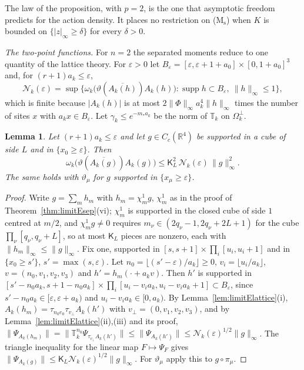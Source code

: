 \documentclass[aps,prd,twocolumn,superscriptaddress,nofootinbib,longbibliography,floatfix,amsmath,amssymb,10pt]{revtex4-2}
\newtheorem{lemma}[theorem]{Lemma}
\theoremstyle{definition}
\theoremstyle{remark}
\newcommand{\R}{\mathbb{R}}
\begin{document}
The law of the proposition, with $p=2$, is the one that asymptotic freedom
predicts for the action density. It places no restriction on
(M$_{\mathrm s}$) when $K$ is bounded on $\{|z|_\infty\ge\delta\}$ for every
$\delta>0$.

\emph{The two-point functions.} For $n=2$ the separated moments reduce to
one quantity of the lattice theory. For $\varepsilon>0$ let $B_\varepsilon=
[\varepsilon,\varepsilon+1+a_0]\times[0,1+a_0]^3$ and, for $(r+1)a_k\le
\varepsilon$,
\[
\mathcal N_k(\varepsilon)=\sup\bigl\{\omega_k\bigl(\vartheta(\overline{
A_k(h)})A_k(h)\bigr):\operatorname{supp}h\subset B_\varepsilon,\ \|h\|_\infty
\le1\bigr\},
\]
which is finite because $|A_k(h)|$ is at most $2\|\Phi\|_\infty
a_k^4\|h\|_\infty$ times the number of sites $x$ with $a_kx\in
B_\varepsilon$. Let $\gamma_k\le e^{-m_*a_k}$ be the norm of
$\mathbb T_k$ on $\Omega_k^\perp$.

\begin{lemma}\label{lem:limitEbox}
Let $(r+1)a_k\le\varepsilon$ and let $g\in C_c(\R^4)$ be supported in a cube
of side $L$ and in $\{x_0\ge\varepsilon\}$. Then
\[
\omega_k\bigl(\vartheta(\overline{A_k(g)})A_k(g)\bigr)\le\mathsf K_L^2\,
\mathcal N_k(\varepsilon)\,\|g\|_\infty^2 .
\]
The same holds with $\vartheta_\mu$ for $g$ supported in
$\{x_\mu\ge\varepsilon\}$.
\end{lemma}

\begin{proof}
Write $g=\sum_mh_m$ with $h_m=\chi^1_mg$, $\chi^1_m$ as in the proof of
Theorem~\ref{thm:limitEsep}(vi); $\chi^1_m$ is supported in the closed cube
of side $1$ centred at $m/2$, and $\chi^1_mg\ne0$ requires
$m_\nu\in(2q_\nu-1,2q_\nu+2L+1)$ for the cube $\prod_\nu[q_\nu,q_\nu+L]$,
so at most $\mathsf K_L$ pieces are nonzero, each with $\|h_m\|_\infty\le\|g
\|_\infty$. Fix one, supported in $[s,s+1]\times\prod_i[u_i,u_i+1]$ and in
$\{x_0\ge s'\}$, $s'=\max(s,\varepsilon)$. Let $n_0=\lfloor(s'-\varepsilon)
/a_k\rfloor\ge0$, $v_i=\lfloor u_i/a_k\rfloor$, $v=(n_0,v_1,v_2,v_3)$ and
$h'=h_m(\cdot+a_kv)$. Then $h'$ is supported in $[s'-n_0a_k,s+1-n_0a_k]\times
\prod_i[u_i-v_ia_k,u_i-v_ia_k+1]\subset B_\varepsilon$, since $s'-n_0a_k\in
[\varepsilon,\varepsilon+a_k)$ and $u_i-v_ia_k\in[0,a_k)$. By
Lemma~\ref{lem:limitElattice}(i), $A_k(h_m)=\tau_{n_0e_0}\tau_{v_\perp}
A_k(h')$ with $v_\perp=(0,v_1,v_2,v_3)$, and by
Lemma~\ref{lem:limitElattice}(ii),(iii) and its proof,
$\|\Psi_{A_k(h_m)}\|=\|\mathbb T_k^{n_0}\Psi_{\tau_{v_\perp}A_k(h')}\|\le
\|\Psi_{A_k(h')}\|\le\mathcal N_k(\varepsilon)^{1/2}\|g\|_\infty$. The
triangle inequality for the linear map $F\mapsto\Psi_F$ gives
$\|\Psi_{A_k(g)}\|\le\mathsf K_L\mathcal N_k(\varepsilon)^{1/2}\|g\|_\infty$.
For $\vartheta_\mu$ apply this to $g\circ\pi_\mu$.
\end{proof}
\end{document}
